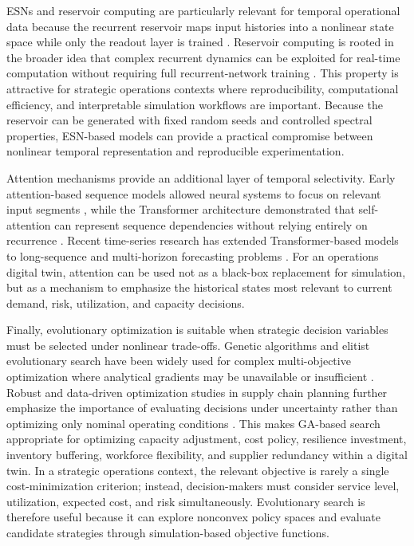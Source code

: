 \documentclass[apajournal,article,submit,pdftex,moreauthors]{Definitions/mdpi}
\begin{document}
ESNs and reservoir computing are particularly relevant for temporal operational data because the recurrent reservoir maps input histories into a nonlinear state space while only the readout layer is trained \citep{jaeger2004harnessing,lukosevicius2009reservoir,salinas2024esnreview}. Reservoir computing is rooted in the broader idea that complex recurrent dynamics can be exploited for real-time computation without requiring full recurrent-network training \citep{maass2002realtime,nakajima2022reservoir}. This property is attractive for strategic operations contexts where reproducibility, computational efficiency, and interpretable simulation workflows are important. Because the reservoir can be generated with fixed random seeds and controlled spectral properties, ESN-based models can provide a practical compromise between nonlinear temporal representation and reproducible experimentation.

Attention mechanisms provide an additional layer of temporal selectivity. Early attention-based sequence models allowed neural systems to focus on relevant input segments \citep{bahdanau2014neural}, while the Transformer architecture demonstrated that self-attention can represent sequence dependencies without relying entirely on recurrence \citep{vaswani2017attention}. Recent time-series research has extended Transformer-based models to long-sequence and multi-horizon forecasting problems \citep{zhou2021informer,lim2021tft,wen2026transformersurvey}. For an operations digital twin, attention can be used not as a black-box replacement for simulation, but as a mechanism to emphasize the historical states most relevant to current demand, risk, utilization, and capacity decisions.

Finally, evolutionary optimization is suitable when strategic decision variables must be selected under nonlinear trade-offs. Genetic algorithms and elitist evolutionary search have been widely used for complex multi-objective optimization where analytical gradients may be unavailable or insufficient \citep{deb2002fast}. Robust and data-driven optimization studies in supply chain planning further emphasize the importance of evaluating decisions under uncertainty rather than optimizing only nominal operating conditions \citep{gao2019robust,ning2021datadriven,basciftci2022vaccine,perea2022feedback,ghasemian2025resilient}. This makes GA-based search appropriate for optimizing capacity adjustment, cost policy, resilience investment, inventory buffering, workforce flexibility, and supplier redundancy within a digital twin. In a strategic operations context, the relevant objective is rarely a single cost-minimization criterion; instead, decision-makers must consider service level, utilization, expected cost, and risk simultaneously. Evolutionary search is therefore useful because it can explore nonconvex policy spaces and evaluate candidate strategies through simulation-based objective functions.
\end{document}
